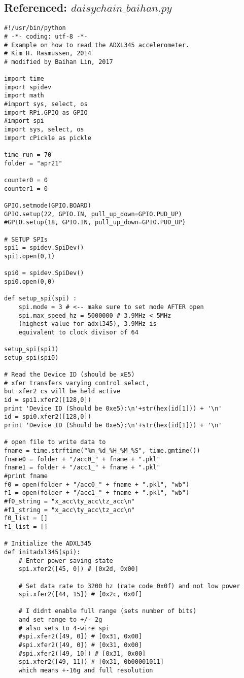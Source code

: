 \documentclass{sigchi}
\begin{document}
\subsection{Referenced: $daisychain\_baihan.py$}\label{ss:daisy}
\begin{lstlisting}
#!/usr/bin/python
# -*- coding: utf-8 -*-
# Example on how to read the ADXL345 accelerometer.
# Kim H. Rasmussen, 2014
# modified by Baihan Lin, 2017

import time
import spidev
import math
#import sys, select, os
import RPi.GPIO as GPIO
#import spi
import sys, select, os
import cPickle as pickle

time_run = 70
folder = "apr21"

counter0 = 0
counter1 = 0

GPIO.setmode(GPIO.BOARD)
GPIO.setup(22, GPIO.IN, pull_up_down=GPIO.PUD_UP)
#GPIO.setup(18, GPIO.IN, pull_up_down=GPIO.PUD_UP)

# SETUP SPIs
spi1 = spidev.SpiDev()
spi1.open(0,1)

spi0 = spidev.SpiDev()
spi0.open(0,0)

def setup_spi(spi) :
    spi.mode = 3 # <-- make sure to set mode AFTER open
    spi.max_speed_hz = 5000000 # 3.9MHz < 5MHz 
    (highest value for adxl345), 3.9MHz is 
    equivalent to clock divisor of 64

setup_spi(spi1)
setup_spi(spi0)

# Read the Device ID (should be xE5)
# xfer transfers varying control select, 
but xfer2 cs will be held active
id = spi1.xfer2([128,0])
print 'Device ID (Should be 0xe5):\n'+str(hex(id[1])) + '\n'
id = spi0.xfer2([128,0])
print 'Device ID (Should be 0xe5):\n'+str(hex(id[1])) + '\n'

# open file to write data to
fname = time.strftime("%m_%d_%H_%M_%S", time.gmtime())
fname0 = folder + "/acc0_" + fname + ".pkl"
fname1 = folder + "/acc1_" + fname + ".pkl"
#print fname
f0 = open(folder + "/acc0_" + fname + ".pkl", "wb")
f1 = open(folder + "/acc1_" + fname + ".pkl", "wb")
#f0_string = "x_acc\ty_acc\tz_acc\n"
#f1_string = "x_acc\ty_acc\tz_acc\n"
f0_list = []
f1_list = []

# Initialize the ADXL345
def initadxl345(spi):
    # Enter power saving state
    spi.xfer2([45, 0]) # [0x2d, 0x00]

    # Set data rate to 3200 hz (rate code 0x0f) and not low power
    spi.xfer2([44, 15]) # [0x2c, 0x0f]

    # I didnt enable full range (sets number of bits) 
    and set range to +/- 2g 
    # also sets to 4-wire spi
    #spi.xfer2([49, 0]) # [0x31, 0x00]
    #spi.xfer2([49, 0]) # [0x31, 0x00]
    #spi.xfer2([49, 10]) # [0x31, 0x00]
    spi.xfer2([49, 11]) # [0x31, 0b00001011] 
    which means +-16g and full resolution
    


\end{lstlisting}
\end{document}
